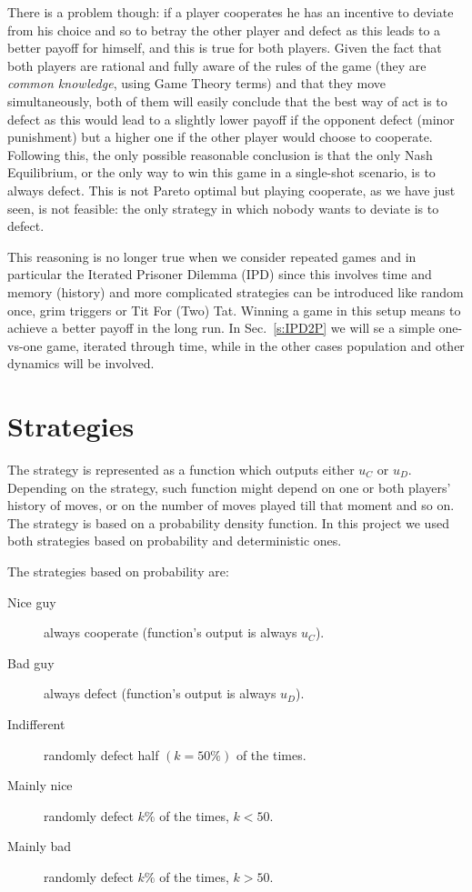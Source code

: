 \documentclass[journal,a4paper,10pt,twoside]{IEEEtran}
\begin{document}
There is a problem though: if a player cooperates he has an incentive to deviate from his choice and so to betray the other player and defect as this leads to a better payoff for himself, and this is true for both players. 
Given the fact that both players are rational and fully aware of the rules of the game (they are \textit{common knowledge}, using Game Theory terms) and that they move simultaneously, both of them will easily conclude that the best way of act is to defect as this would lead to a slightly lower payoff if the opponent defect (minor punishment) but a higher one if the other player would choose to cooperate.
Following this, the only possible reasonable conclusion is that the only Nash Equilibrium, or the only way to win this game in a single-shot scenario, is to always defect.
This is not Pareto optimal but playing cooperate, as we have just seen, is not feasible: the only strategy in which nobody wants to deviate is to defect.

This reasoning is no longer true when we consider repeated games and in particular the Iterated Prisoner Dilemma (IPD) since this involves time and memory (history) and more complicated strategies can be introduced like random once, grim triggers or Tit For (Two) Tat.
Winning a game in this setup means to achieve a better payoff in the long run. In Sec.~\ref{s:IPD2P} we will se a simple one-vs-one game, iterated through time, while in the other cases population and other dynamics will be involved.

\section{Strategies} \label{s:str}
The strategy is represented as a function which outputs either $u_C$ or $u_D$. Depending on the strategy, such function might depend on one or both players' history of moves, or on the number of moves played till that moment and so on.
The strategy is based on a probability density function. In this project we used both strategies based on probability and deterministic ones.

The strategies based on probability are:

\begin{description}
    \item[Nice guy] always cooperate (function's output is always $u_C$).
    \item[Bad guy] always defect (function's output is always $u_D$).
    \item[Indifferent] randomly defect half $(k=50\%)$ of the times.
    \item[Mainly nice] randomly defect $k\%$ of the times, $k<50$.%
    \item[Mainly bad] randomly defect $k\%$ of the times, $k>50$.%
\end{description}
\end{document}
